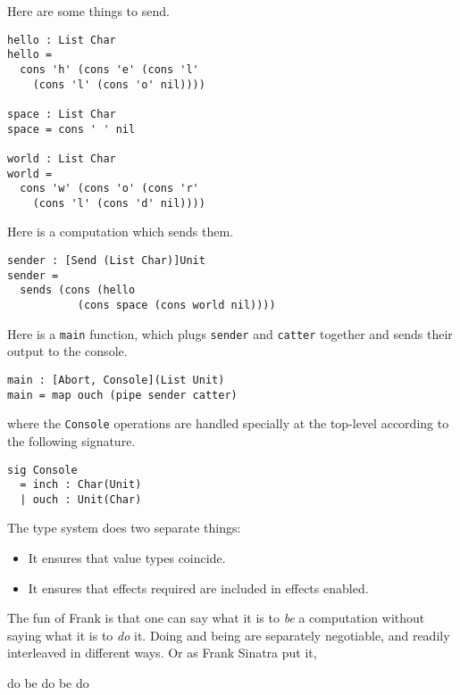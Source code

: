 \documentclass[preprint]{sigplanconf}
\begin{document}
Here are some things to send.
\begin{verbatim}
hello : List Char
hello =
  cons 'h' (cons 'e' (cons 'l'
    (cons 'l' (cons 'o' nil))))

space : List Char
space = cons ' ' nil

world : List Char
world =
  cons 'w' (cons 'o' (cons 'r'
    (cons 'l' (cons 'd' nil))))
\end{verbatim}
%
Here is a computation which sends them.
%
\begin{verbatim}
sender : [Send (List Char)]Unit
sender =
  sends (cons (hello
           (cons space (cons world nil))))
\end{verbatim}

Here is a \verb!main! function, which plugs \verb!sender! and
\verb!catter!  together and sends their output to the console.
%
\begin{verbatim}
main : [Abort, Console](List Unit)
main = map ouch (pipe sender catter)
\end{verbatim}
where the \verb!Console! operations are handled specially at the
top-level according to the following signature.
\begin{verbatim}
sig Console
  = inch : Char(Unit)
  | ouch : Unit(Char)
\end{verbatim}

The type system does two separate things:
\begin{itemize}
\item It ensures that value types coincide.
\item It ensures that effects required are included in effects
  enabled.
\end{itemize}

The fun of Frank is that one can say what it is to \emph{be} a
computation without saying what it is to \emph{do} it. Doing and being
are separately negotiable, and readily interleaved in different
ways. Or as Frank Sinatra put it,
\begin{center}
do be do be do
\end{center}




\end{document}
